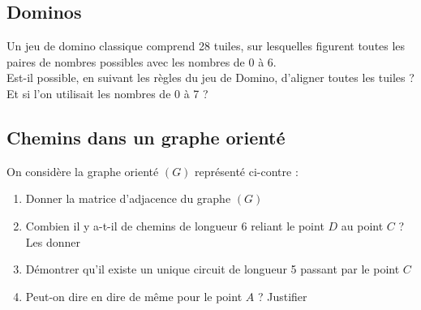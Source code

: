 \documentclass[oneside,12pt]{article}          %
\begin{document}
\subsection{Dominos}
Un jeu de domino classique comprend 28 tuiles, sur lesquelles figurent toutes les paires de nombres possibles avec les nombres de 0 à 6.\\
Est-il possible, en suivant les règles du jeu de Domino, d'aligner toutes les tuiles ?\\
Et si l'on utilisait les nombres de 0 à 7 ?



\subsection{Chemins dans un graphe orienté}
On considère la graphe orienté $(G)$ représenté ci-contre : \\

\begin{minipage}{0.6\linewidth}
    \begin{enumerate}
        \item Donner la matrice d'adjacence du graphe $(G)$
        \item Combien il y a-t-il de chemins de longueur 6 reliant le point $D$ au point $C$ ? Les donner
        \item Démontrer qu'il existe un unique circuit de longueur 5 passant par le point $C$
        \item Peut-on dire en dire de même pour le point $A$ ? Justifier
    \end{enumerate}
\end{minipage}
\hfill
\begin{minipage}{0.3\linewidth}
\end{minipage}
\end{document}

